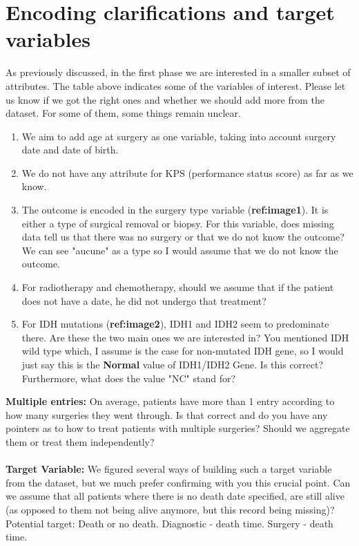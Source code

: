 \documentclass[a4paper]{article}
\begin{document}
\section{Encoding clarifications and target variables}
As previously discussed, in the first phase we are interested in a smaller subset of attributes. The table above indicates some of the variables of interest. Please let us know if we got the right ones and whether we should add more from the dataset. For some of them, some things remain unclear.\\
\begin{enumerate}
\item We aim to add age at surgery as one variable, taking into account surgery date and date of birth. 
\item We do not have any attribute for KPS (performance status score) as far as we know. 
\item The outcome is encoded in the surgery type variable (\textbf{ref:image1}). It is either a type of surgical removal or biopsy. For this variable, does missing data tell us that there was no surgery or that we do not know the outcome?
We can see "aucune" as a type so I would assume that we do not know the outcome. 
\item For radiotherapy and chemotherapy, should we assume that if the patient does not have a date, he did not undergo that treatment? 
\item For IDH mutations (\textbf{ref:image2}), IDH1 and IDH2 seem to predominate there. Are these the two main ones we are interested in? You mentioned IDH wild type which, I assume is the case for non-mutated IDH gene, so I would just say this is the \textbf{Normal} value of IDH1/IDH2 Gene. Is this correct? Furthermore, what does the value "NC" stand for?
\end{enumerate}
%
\textbf{Multiple entries:} On average, patients have more than 1 entry according to how many surgeries they went through. Is that correct and do you have any pointers as to how to treat patients with multiple surgeries? Should we aggregate them or treat them independently? \\
\\ 
\textbf{Target Variable:}
We figured several ways of building such a target variable from the dataset, but we much prefer confirming with you this crucial point.
Can we assume that all patients where there is no death date specified, are still alive (as opposed to them not being alive anymore, but this record being missing)?
Potential target: Death or no death. Diagnostic - death time. Surgery - death time. 
\end{document}
